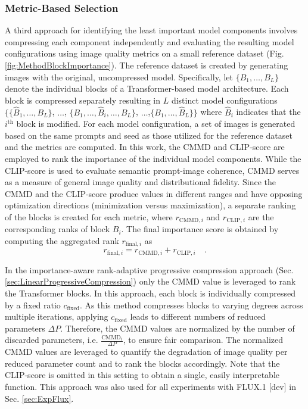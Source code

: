 \subsubsection{Metric-Based Selection}
\label{sec:MetricBasedSelection}
A third approach for identifying the least important model components involves compressing each component independently and evaluating the resulting model configurations using image quality metrics on a small reference dataset (Fig. \ref{fig:MethodBlockImportance}). The reference dataset is created by generating images with the original, uncompressed model. Specifically, let $\{B_1, \dots, B_L\}$ denote the individual blocks of a Transformer-based model architecture. Each block is compressed separately resulting in $L$ distinct model configurations $\{\{\hat{B}_1, \dots, B_L\}$, $\dots$, $\{B_1, \dots, \hat{B}_i, \dots,  B_L\}$, $\dots$,$\{B_1, \dots, \hat{B}_L\}\}$ where $\hat{B}_i$ indicates that the $i^\text{th}$ block is modified. For each model configuration, a set of images is generated based on the same prompts and seed as those utilized for the reference dataset and the metrics are computed. In this work, the \gls{CMMD} and \gls{CLIP}-score are employed to rank the importance of the individual model components. While the \gls{CLIP}-score is used to evaluate semantic prompt-image coherence, \gls{CMMD} serves as a measure of general image quality and distributional fidelity. Since the \gls{CMMD} and the \gls{CLIP}-score produce values in different ranges and have opposing optimization directions (minimization versus maximization), a separate ranking of the blocks is created for each metric, where $r_{\text{CMMD},i}$ and  $r_{\text{CLIP},i}$ are the corresponding ranks of block $B_i$. The final importance score is obtained by computing the aggregated rank $r_{\text{final},i}$ as
\begin{equation}
	r_{\text{final},i} = r_{\text{CMMD},i} + r_{\text{CLIP},i} \quad.
	\label{eq:combined_importance}
\end{equation}



In the importance-aware rank-adaptive progressive compression approach (Sec. \ref{sec:LinearProgressiveCompression}) only the \gls{CMMD} value is leveraged to rank the Transformer blocks. In this approach, each block is individually compressed by a fixed ratio $c_\text{fixed}$. As this method compresses blocks to varying degrees across multiple iterations, applying $c_\text{fixed}$ leads to different numbers of reduced parameters $\Delta P$. Therefore, the \gls{CMMD} values are normalized by the number of discarded parameters, i.e. $\frac{\text{CMMD}_i}{\Delta P}$, to ensure fair comparison. The normalized \gls{CMMD} values are leveraged to quantify the degradation of image quality per reduced parameter count and to rank the blocks accordingly.  Note that the \gls{CLIP}-score is omitted in this setting to obtain a single, easily interpretable function. This approach was also used for all experiments with FLUX.1 {[dev]} in Sec. \ref{sec:ExpFlux}.

